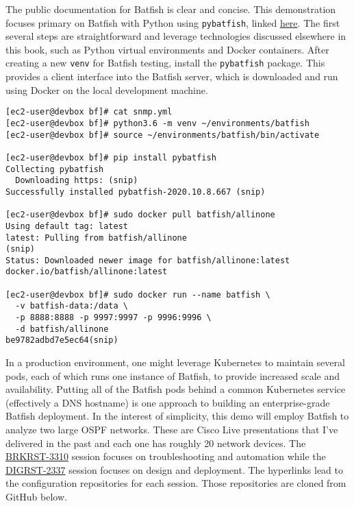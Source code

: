 The public documentation for Batfish is clear and concise. This demonstration
focuses primary on Batfish with Python using \verb|pybatfish|, linked
\href{https://pybatfish.readthedocs.io/en/latest/}{here}. The first several
steps are straightforward and leverage technologies discussed elsewhere in
this book, such as Python virtual environments and Docker containers. After
creating a new \verb|venv| for Batfish testing, install the \verb|pybatfish|
package. This provides a client interface into the Batfish server, which is
downloaded and run using Docker on the local development machine.

\begin{verbatim}
[ec2-user@devbox bf]# cat snmp.yml 
[ec2-user@devbox bf]# python3.6 -m venv ~/environments/batfish
[ec2-user@devbox bf]# source ~/environments/batfish/bin/activate

[ec2-user@devbox bf]# pip install pybatfish
Collecting pybatfish
  Downloading https: (snip)
Successfully installed pybatfish-2020.10.8.667 (snip)

[ec2-user@devbox bf]# sudo docker pull batfish/allinone
Using default tag: latest
latest: Pulling from batfish/allinone
(snip)
Status: Downloaded newer image for batfish/allinone:latest
docker.io/batfish/allinone:latest

[ec2-user@devbox bf]# sudo docker run --name batfish \
  -v batfish-data:/data \
  -p 8888:8888 -p 9997:9997 -p 9996:9996 \
  -d batfish/allinone
be9782adbd7e5ec64(snip)
\end{verbatim}

In a production environment, one might leverage Kubernetes to maintain
several pods, each of which runs one instance of Batfish, to provide
increased scale and availability. Putting all of the Batfish pods behind
a common Kubernetes service (effectively a DNS hostname) is one approach
to building an enterprise-grade Batfish deployment. In the interest
of simplicity, this demo will employ Batfish to analyze two large OSPF
networks. These are Cisco Live presentations that I've delivered in the
past and each one has roughly 20 network devices. The
\href{https://github.com/nickrusso42518/ospf_brkrst3310}{BRKRST-3310}
session focuses on troubleshooting and automation while the
\href{https://github.com/nickrusso42518/ospf_digrst2337}{DIGRST-2337}
session focuses on design and deployment. The hyperlinks lead to the
configuration repositories for each session. Those repositories are
cloned from GitHub below.

